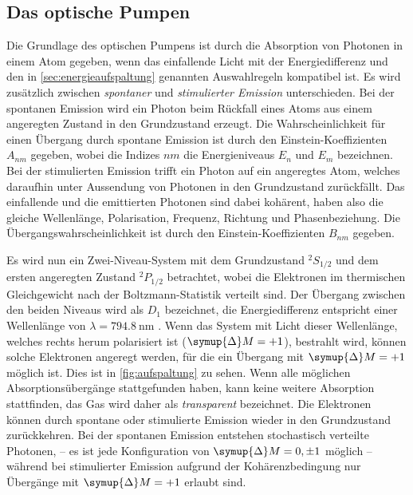 \subsection{Das optische Pumpen}

    Die Grundlage des optischen Pumpens ist durch die Absorption von Photonen in einem Atom gegeben,
    wenn das einfallende Licht mit der Energiedifferenz und den in \autoref{sec:energieaufspaltung} genannten Auswahlregeln kompatibel ist.
    Es wird zusätzlich zwischen \textit{spontaner} und \textit{stimulierter Emission} unterschieden.
    Bei der spontanen Emission wird ein Photon beim Rückfall eines Atoms aus einem angeregten Zustand in den Grundzustand erzeugt.
    Die Wahrscheinlichkeit für einen Übergang durch spontane Emission ist durch den Einstein-Koeffizienten $A_{nm}$ gegeben,
    wobei die Indizes $nm$ die Energieniveaus $E_n$ und $E_m$ bezeichnen.
    Bei der stimulierten Emission trifft ein Photon auf ein angeregtes Atom,
    welches daraufhin unter Aussendung von Photonen in den Grundzustand zurückfällt.
    Das einfallende und die emittierten Photonen sind dabei kohärent,
    haben also die gleiche Wellenlänge, Polarisation, Frequenz, Richtung und Phasenbeziehung.
    Die Übergangswahrscheinlichkeit ist durch den Einstein-Koeffizienten $B_{nm}$ gegeben.

    Es wird nun ein Zwei-Niveau-System mit dem Grundzustand $^2S_{1/2}$ und dem ersten angeregten Zustand $^2P_{1/2}$ betrachtet,
    wobei die Elektronen im thermischen Gleichgewicht nach der Boltzmann-Statistik verteilt sind.
    Der Übergang zwischen den beiden Niveaus wird als $D_1$ bezeichnet,
    die Energiedifferenz entspricht einer Wellenlänge von $\lambda = \SI{794.8}{\nano\meter}$ \cite{versuchsanleitung}.
    Wenn das System mit Licht dieser Wellenlänge,
    welches rechts herum polarisiert ist ($\symup{\Delta}M = +1$),
    bestrahlt wird,
    können solche Elektronen angeregt werden,
    für die ein Übergang mit $\symup{\Delta}M = +1$ möglich ist.
    Dies ist in \autoref{fig:aufspaltung} zu sehen.
    Wenn alle möglichen Absorptionsübergänge stattgefunden haben,
    kann keine weitere Absorption stattfinden,
    das Gas wird daher als \textit{transparent} bezeichnet.
    Die Elektronen können durch spontane oder stimulierte Emission wieder in den Grundzustand zurückkehren.
    Bei der spontanen Emission entstehen stochastisch verteilte Photonen,
    – es ist jede Konfiguration von $\symup{\Delta}M = 0, \pm 1$ möglich –
    während bei stimulierter Emission aufgrund der Kohärenzbedingung nur Übergänge mit $\symup{\Delta}M = +1$ erlaubt sind.

